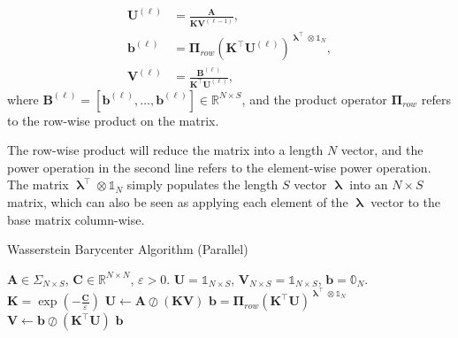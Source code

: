 \begin{update}\label{update:wasserstein-barycenter-parallel}
  \begin{equation}\label{eqn:barycenter-sinkhorn-like-matrix-update}
    \begin{aligned}
      \mathbf{U}^{(\ell)}
       & = \frac{\mathbf{A}}{\mathbf{K} \mathbf{V}^{(\ell-1)}},                                          \\
      \mathbf{b}^{(\ell)}
       & = \boldsymbol{\Pi}_{row}
      \left(\mathbf{K}^\top \mathbf{U}^{(\ell)}\right)^{\boldsymbol\uplambda^\top \otimes \mathbb{1}_N}, \\
      \mathbf{V}^{(\ell)}
       & = \frac{\mathbf{B}^{(\ell)}}{\mathbf{K}^\top \mathbf{U}^{(\ell)}},
    \end{aligned}
  \end{equation}
  where $\mathbf{B}^{(\ell)} = \left[\mathbf{b}^{(\ell)}, \ldots, \mathbf{b}^{(\ell)}\right] \in \mathbb{R}^{N\times S}$,
  and the product operator $\boldsymbol\Pi_{row}$ refers to the row-wise product on the matrix.
\end{update}

The row-wise product will reduce the matrix into a length $N$ vector,
and the power operation in the second line refers to the element-wise power operation.
The matrix $\boldsymbol\uplambda^\top \otimes \mathbb{1}_N$ simply populates the length $S$ vector
$\boldsymbol\uplambda$ into an $N\times S$ matrix,
which can also be seen as applying each element of the $\boldsymbol\uplambda$ vector to the base matrix column-wise.



\begin{algorithm}[H]
  \caption{Wasserstein Barycenter Algorithm (Parallel)}
  \begin{algorithmic}[1]\label{algo:wassserstein-barycenter-parallel}
    \Require $\mathbf{A} \in \Sigma_{N \times S}$, $\mathbf{C} \in \mathbb{R}^{N \times N}$, $\varepsilon > 0$.
    \Initialize $\mathbf{U} = \mathbb{1}_{N \times S}$, $\mathbf{V}_{N \times S} = \mathbb{1}_{N \times S}$,
    $\mathbf{b} = \mathbb{0}_N$.
    \State $\mathbf{K} = \exp(-\frac{\mathbf{C}}{\varepsilon})$
    \State $\mathbf{U} \leftarrow \mathbf{A} \oslash (\mathbf{K} \mathbf{V})$
    \State $\mathbf{b} =
      \boldsymbol\Pi_{row}
      \left(\mathbf{K}^\top \mathbf{U}\right)^{\boldsymbol\uplambda^\top \otimes \mathbb{1}_N}
    $
    \State $\mathbf{V} \leftarrow \mathbf{b} \oslash (\mathbf{K}^\top \mathbf{U})$
    \EndWhile
    \Ensure $\mathbf{b}$
  \end{algorithmic}
\end{algorithm}

